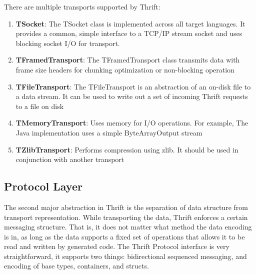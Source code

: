\documentclass[9pt,twocolumn,twoside]{../../styles/osajnl}
\begin{document}
There are multiple transports supported by Thrift:
\begin{enumerate}
	\item \textbf{TSocket}: The TSocket class is implemented across all target languages. It provides a common, simple interface to a TCP/IP stream socket and uses blocking socket I/O for transport.
	\item \textbf{TFramedTransport}: The TFramedTransport class transmits data with frame size headers for chunking optimization or non-blocking operation
	\item \textbf{TFileTransport}: The TFileTransport is an abstraction of an on-disk file to a data stream. It can be used to write out a set of incoming Thrift requests to a file on disk
	\item \textbf{TMemoryTransport}: Uses memory for I/O operations. For example, The Java implementation uses a simple ByteArrayOutput stream
	\item \textbf{TZlibTransport}: Performs compression using zlib. It should be used in conjunction with another transport
\end{enumerate}


\subsection{Protocol Layer}
The second major abstraction in Thrift is the separation of data structure from transport representation. While transporting the data, Thrift enforces a certain messaging structure. That is, it does not matter what method the data encoding is in, as long as the data supports a fixed set of operations that allows it to be read and written by generated code. The Thrift Protocol interface is very straightforward, it supports two things: bidirectional sequenced messaging, and encoding of base types, containers, and structs.
\end{document}
